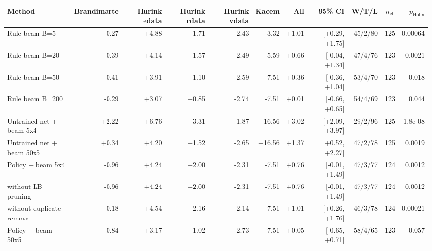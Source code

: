 \begin{tabular}{lrrrrrrrrrr}
\toprule
Method & Brandimarte & Hurink edata & Hurink rdata & Hurink vdata & Kacem & All & 95\% CI & W/T/L & $n_{\mathrm{eff}}$ & $p_{\mathrm{Holm}}$ \\
\midrule
Rule beam B=5 & -0.27 & +4.88 & +1.71 & -2.43 & -3.32 & +1.01 & [+0.29, +1.75] & 45/2/80 & 125 & 0.00064 \\
Rule beam B=20 & -0.39 & +4.14 & +1.57 & -2.49 & -5.59 & +0.66 & [-0.04, +1.34] & 47/4/76 & 123 & 0.0021 \\
Rule beam B=50 & -0.41 & +3.91 & +1.10 & -2.59 & -7.51 & +0.36 & [-0.36, +1.04] & 53/4/70 & 123 & 0.018 \\
Rule beam B=200 & -0.29 & +3.07 & +0.85 & -2.74 & -7.51 & +0.01 & [-0.66, +0.65] & 54/4/69 & 123 & 0.044 \\
Untrained net + beam 5x4 & +2.22 & +6.76 & +3.31 & -1.87 & +16.56 & +3.02 & [+2.09, +3.97] & 29/2/96 & 125 & 1.8e-08 \\
Untrained net + beam 50x5 & +0.34 & +4.20 & +1.52 & -2.65 & +16.56 & +1.37 & [+0.52, +2.27] & 47/2/78 & 125 & 0.0019 \\
Policy + beam 5x4 & -0.96 & +4.24 & +2.00 & -2.31 & -7.51 & +0.76 & [-0.01, +1.49] & 47/3/77 & 124 & 0.0012 \\
  without LB pruning & -0.96 & +4.24 & +2.00 & -2.31 & -7.51 & +0.76 & [-0.01, +1.49] & 47/3/77 & 124 & 0.0012 \\
  without duplicate removal & -0.18 & +4.54 & +2.16 & -2.14 & -7.51 & +1.01 & [+0.26, +1.76] & 46/3/78 & 124 & 0.00021 \\
Policy + beam 50x5 & -0.84 & +3.17 & +1.02 & -2.73 & -7.51 & +0.05 & [-0.65, +0.71] & 58/4/65 & 123 & 0.057 \\
\bottomrule
\end{tabular}
